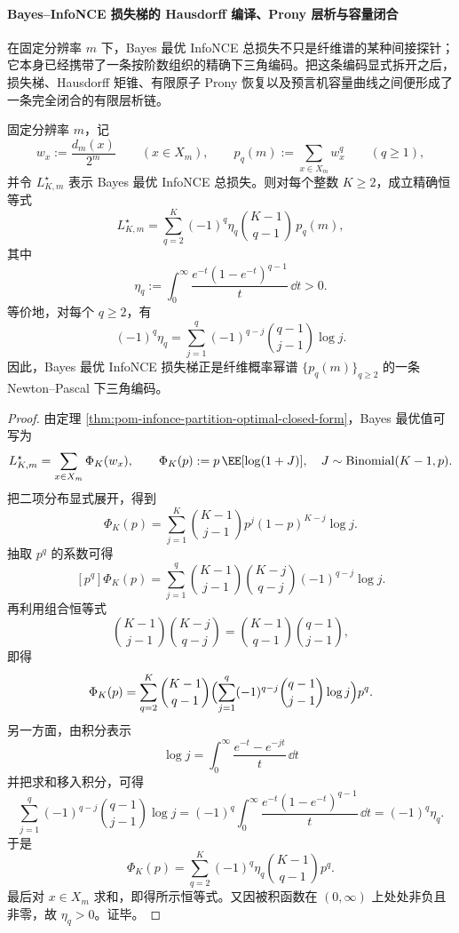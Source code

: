 \paragraph{Bayes--InfoNCE 损失梯的 Hausdorff 编译、Prony 层析与容量闭合}
在固定分辨率 \(m\) 下，Bayes 最优 InfoNCE 总损失不只是纤维谱的某种间接探针；它本身已经携带了一条按阶数组织的精确下三角编码。把这条编码显式拆开之后，损失梯、Hausdorff 矩锥、有限原子 Prony 恢复以及预言机容量曲线之间便形成了一条完全闭合的有限层析链。

\begin{theorem}\label{thm:xi-time-part47ca-infonce-newton-pascal-eta-expansion}
固定分辨率 \(m\)，记
\[
w_x:=\frac{d_m(x)}{2^m}\qquad(x\in X_m),
\qquad
p_q(m):=\sum_{x\in X_m} w_x^q\qquad(q\ge 1),
\]
并令 \(L_{K,m}^{\star}\) 表示 Bayes 最优 InfoNCE 总损失。则对每个整数 \(K\ge 2\)，成立精确恒等式
\[
L_{K,m}^{\star}
=
\sum_{q=2}^{K}(-1)^q\eta_q\binom{K-1}{q-1}\,p_q(m),
\]
其中
\[
\eta_q
:=
\int_0^\infty \frac{e^{-t}(1-e^{-t})^{q-1}}{t}\,\dd t
>0.
\]
等价地，对每个 \(q\ge 2\)，有
\[
(-1)^q\eta_q
=
\sum_{j=1}^{q}(-1)^{q-j}\binom{q-1}{j-1}\log j.
\]
因此，Bayes 最优 InfoNCE 损失梯正是纤维概率幂谱 \(\{p_q(m)\}_{q\ge 2}\) 的一条 Newton--Pascal 下三角编码。
\end{theorem}

\begin{proof}
由定理 \ref{thm:pom-infonce-partition-optimal-closed-form}，Bayes 最优值可写为
\[
L_{K,m}^{\star}
=
\sum_{x\in X_m}\Phi_K(w_x),
\qquad
\Phi_K(p):=
p\,\EE[\log(1+J)],
\quad
J\sim\mathrm{Binomial}(K-1,p).
\]
把二项分布显式展开，得到
\[
\Phi_K(p)
=
\sum_{j=1}^{K}\binom{K-1}{j-1}p^j(1-p)^{K-j}\log j.
\]
抽取 \(p^q\) 的系数可得
\[
[p^q]\Phi_K(p)
=
\sum_{j=1}^{q}\binom{K-1}{j-1}\binom{K-j}{q-j}(-1)^{q-j}\log j.
\]
再利用组合恒等式
\[
\binom{K-1}{j-1}\binom{K-j}{q-j}
=
\binom{K-1}{q-1}\binom{q-1}{j-1},
\]
即得
\[
\Phi_K(p)
=
\sum_{q=2}^{K}\binom{K-1}{q-1}
\Bigl(
\sum_{j=1}^{q}(-1)^{q-j}\binom{q-1}{j-1}\log j
\Bigr)p^q.
\]
另一方面，由积分表示
\[
\log j=\int_0^\infty \frac{e^{-t}-e^{-jt}}{t}\,\dd t
\]
并把求和移入积分，可得
\[
\sum_{j=1}^{q}(-1)^{q-j}\binom{q-1}{j-1}\log j
=
(-1)^q\int_0^\infty \frac{e^{-t}(1-e^{-t})^{q-1}}{t}\,\dd t
=
(-1)^q\eta_q.
\]
于是
\[
\Phi_K(p)=\sum_{q=2}^{K}(-1)^q\eta_q\binom{K-1}{q-1}p^q.
\]
最后对 \(x\in X_m\) 求和，即得所示恒等式。又因被积函数在 \((0,\infty)\) 上处处非负且非零，故 \(\eta_q>0\)。证毕。
\end{proof}

